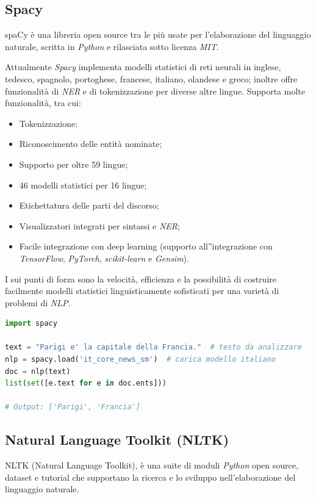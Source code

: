 \documentclass[a4paper,11pt]{article}
\begin{document}
\subsection{Spacy}
\label{extractor:spacy}
spaCy è una libreria open source tra le più usate per l'elaborazione del linguaggio naturale, scritta in \textit{Python} e rilasciata sotto licenza \textit{MIT}. \cite{spacy} 

Attualmente \textit{Spacy} implementa modelli statistici di reti neurali in inglese, tedesco, spagnolo, portoghese, francese, italiano, olandese e greco; inoltre offre funzionalità di \textit{NER} e di tokenizzazione per diverse altre lingue. Supporta molte funzionalità, tra cui:

\begin{itemize}
	\item Tokenizzazione;
	\item Riconoscimento delle entità nominate;
	\item Supporto per oltre 59 lingue;
	\item 46 modelli statistici per 16 lingue;
	\item Etichettatura delle parti del discorso;
	\item Visualizzatori integrati per sintassi e \textit{NER};
	\item Facile integrazione con deep learning (supporto all''integrazione con \textit{TensorFlow}, \textit{PyTorch}, \textit{scikit-learn} e \textit{Gensim}).
\end{itemize}

I sui punti di forza sono la velocità, efficienza e la possibilità di costruire facilmente modelli statistici linguisticamente sofisticati per una varietà di problemi di \textit{NLP}.
\newline
\begin{lstlisting}[basicstyle=\small, language=python, frame=single, caption={Esempio di codice Python per l'estrazione di entità con \textit{Spacy}.},captionpos=b]
import spacy

text = "Parigi e' la capitale della Francia."  # testo da analizzare
nlp = spacy.load('it_core_news_sm')  # carica modello italiano
doc = nlp(text)
list(set([e.text for e in doc.ents]))

# Output: ['Parigi', 'Francia']
\end{lstlisting}

\subsection{Natural Language Toolkit (NLTK)}
\label{extractor:nltk}
NLTK (Natural Language Toolkit), è una suite di moduli \textit{Python} open source, dataset e tutorial che supportano la ricerca e lo sviluppo nell'elaborazione del linguaggio naturale. \cite{nltk}
\end{document}
